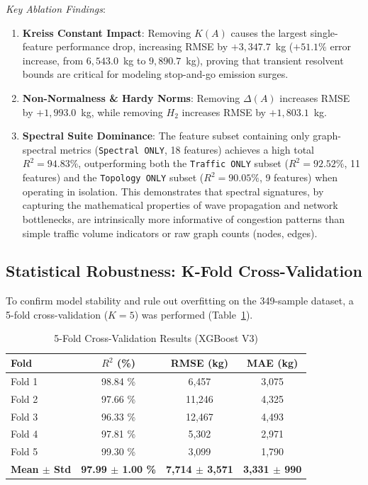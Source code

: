 \documentclass[lettersize,journal]{IEEEtran}
\begin{document}
\textit{Key Ablation Findings}:
\begin{enumerate}
    \item \textbf{Kreiss Constant Impact}: Removing $K(A)$ causes the largest single-feature performance drop, increasing RMSE by $+3,347.7$~kg ($+51.1\%$ error increase, from $6,543.0$~kg to $9,890.7$~kg), proving that transient resolvent bounds are critical for modeling stop-and-go emission surges.
    \item \textbf{Non-Normalness \& Hardy Norms}: Removing $\Delta(A)$ increases RMSE by $+1,993.0$~kg, while removing $H_2$ increases RMSE by $+1,803.1$~kg.
    \item \textbf{Spectral Suite Dominance}: The feature subset containing only graph-spectral metrics (\texttt{Spectral ONLY}, 18 features) achieves a high total $R^2 = 94.83\%$, outperforming both the \texttt{Traffic ONLY} subset ($R^2 = 92.52\%$, 11 features) and the \texttt{Topology ONLY} subset ($R^2 = 90.05\%$, 9 features) when operating in isolation. This demonstrates that spectral signatures, by capturing the mathematical properties of wave propagation and network bottlenecks, are intrinsically more informative of congestion patterns than simple traffic volume indicators or raw graph counts (nodes, edges).

\end{enumerate}

\subsection{Statistical Robustness: K-Fold Cross-Validation}
To confirm model stability and rule out overfitting on the 349-sample dataset, a 5-fold cross-validation ($K=5$) was performed (Table~\ref{tab:kfold}).

\begin{table}[htbp]
\caption{5-Fold Cross-Validation Results (XGBoost V3)}
\label{tab:kfold}
\centering
\begin{tabular}{lccc}
\toprule
Fold & $R^2$ (\%) & RMSE (kg) & MAE (kg) \\
\midrule
Fold 1 & 98.84 \% & 6,457 & 3,075 \\
Fold 2 & 97.66 \% & 11,246 & 4,325 \\
Fold 3 & 96.33 \% & 12,467 & 4,493 \\
Fold 4 & 97.81 \% & 5,302 & 2,971 \\
Fold 5 & 99.30 \% & 3,099 & 1,790 \\
\midrule
\textbf{Mean $\pm$ Std} & \textbf{97.99 $\pm$ 1.00 \%} & \textbf{7,714 $\pm$ 3,571} & \textbf{3,331 $\pm$ 990} \\
\bottomrule
\end{tabular}
\end{table}
\end{document}
